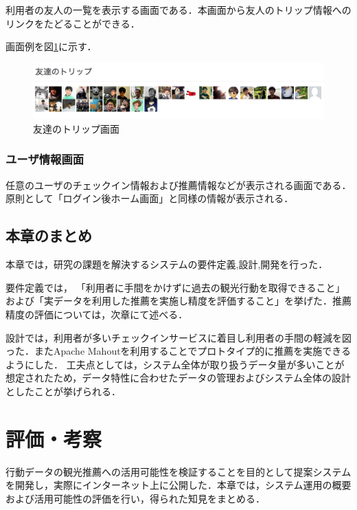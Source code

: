 \documentclass{jsarticle}
\begin{document}
利用者の友人の一覧を表示する画面である．本画面から友人のトリップ情報へのリンクをたどることができる．

画面例を図\ref{cheekitrip_friends}に示す．

\begin{figure}[!ht]
\begin{center}
\includegraphics[width=12.0cm]{./image/cheekitrip_friends.png}
\caption{友達のトリップ画面}
\label{cheekitrip_friends}
\end{center}
\end{figure}

\subsubsection{ユーザ情報画面}

任意のユーザのチェックイン情報および推薦情報などが表示される画面である．原則として「ログイン後ホーム画面」と同様の情報が表示される．

\subsection{本章のまとめ}

本章では，研究の課題を解決するシステムの要件定義,設計,開発を行った．

要件定義では， 「利用者に手間をかけずに過去の観光行動を取得できること」および「実データを利用した推薦を実施し精度を評価すること」を挙げた．推薦精度の評価については，次章にて述べる．

設計では，利用者が多いチェックインサービスに着目し利用者の手間の軽減を図った．またApache Mahoutを利用することでプロトタイプ的に推薦を実施できるようにした． 工夫点としては，システム全体が取り扱うデータ量が多いことが想定されたため，データ特性に合わせたデータの管理およびシステム全体の設計としたことが挙げられる．


\newpage

\section{評価・考察}

行動データの観光推薦への活用可能性を検証することを目的として提案システムを開発し，実際にインターネット上に公開した．本章では，システム運用の概要および活用可能性の評価を行い，得られた知見をまとめる．
\end{document}
